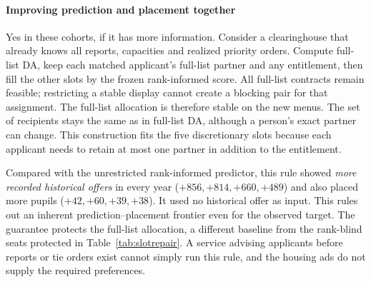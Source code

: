 \paragraph{Improving prediction and placement together}
Yes in these cohorts, if it has more information. Consider a clearinghouse that already knows all reports, capacities and realized priority orders. Compute full-list DA, keep each matched applicant's full-list partner and any entitlement, then fill the other slots by the frozen rank-informed score. All full-list contracts remain feasible; restricting a stable display cannot create a blocking pair for that assignment. The full-list allocation is therefore stable on the new menus. The set of recipients stays the same as in full-list DA, although a person's exact partner can change. This construction fits the five discretionary slots because each applicant needs to retain at most one partner in addition to the entitlement.

Compared with the unrestricted rank-informed predictor, this rule showed \emph{more recorded historical offers} in every year ($+856,+814,+660,+489$) and also placed more pupils ($+42,+60,+39,+38$). It used no historical offer as input. This rules out an inherent prediction--placement frontier even for the observed target. The guarantee protects the full-list allocation, a different baseline from the rank-blind seats protected in Table~\ref{tab:slotrepair}. A service advising applicants before reports or tie orders exist cannot simply run this rule, and the housing ads do not supply the required preferences.
